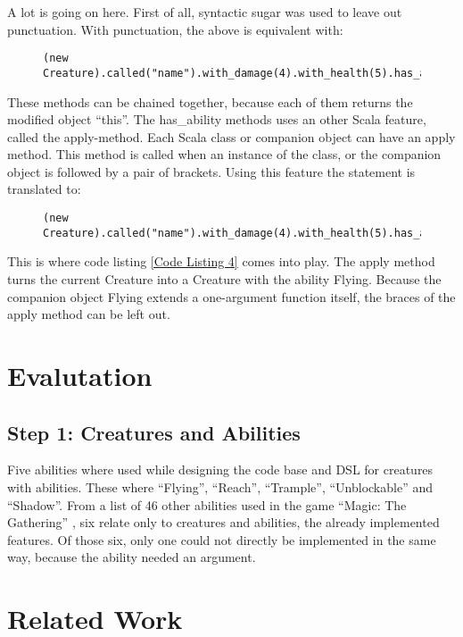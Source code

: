 \documentclass[twocolumn]{phdsymp}
\begin{document}
A lot is going on here. First of all, syntactic sugar was used to leave out punctuation. With punctuation, the above is equivalent with:
\begin{figure}[H]
\label{Code Listing 6}
\begin{verbatim}
(new Creature).called("name").with_damage(4).with_health(5).has_ability(Flying())
\end{verbatim}
\end{figure}
These methods can be chained together, because each of them returns the modified object ``this''. The has\_ability methods uses an other Scala feature, called the apply-method. Each Scala class or companion object can have an apply method. This method is called when an instance of the class, or the companion object is followed by a pair of brackets. Using this feature the statement is translated to:
\begin{figure}[H]
\label{Code Listing 7}
\begin{verbatim}
(new Creature).called("name").with_damage(4).with_health(5).has_ability(Flying.apply())
\end{verbatim}
\end{figure}
This is where code listing \ref{Code Listing 4} comes into play. The apply method turns the current Creature into a Creature with the ability Flying. Because the companion object Flying extends a one-argument function itself, the braces of the apply method can be left out.

\section{Evalutation}
\label{Evaluation}
\subsection*{Step 1: Creatures and Abilities}
Five abilities where used while designing the code base and DSL for creatures with abilities. These where ``Flying'', ``Reach'', ``Trample'', ``Unblockable'' and ``Shadow''. From a list of 46 other abilities used in the game ``Magic: The Gathering'' \cite{List of abilities}, six relate only to creatures and abilities, the already implemented features. Of those six, only one could not directly be implemented in the same way, because the ability needed an argument.

\section{Related Work}
\label{Related Work}
\end{document}
